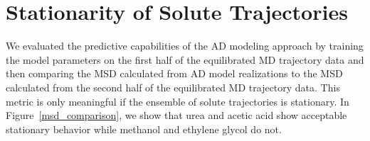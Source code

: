 \documentclass{article}
\begin{document}
  \newpage 
  
  \section{Stationarity of Solute Trajectories}\label{section:msd_comparison}
  
  We evaluated the predictive capabilities of the AD modeling approach by training
  the model parameters on the first half of the equilibrated MD trajectory data and
  then comparing the MSD calculated from AD model realizations to the MSD calculated
  from the second half of the equilibrated MD trajectory data. This metric is
  only meaningful if the ensemble of solute trajectories is stationary. In 
  Figure~\ref{msd_comparison}, we show that urea and acetic acid show acceptable
  stationary behavior while methanol and ethylene glycol do not.
  
\end{document}
